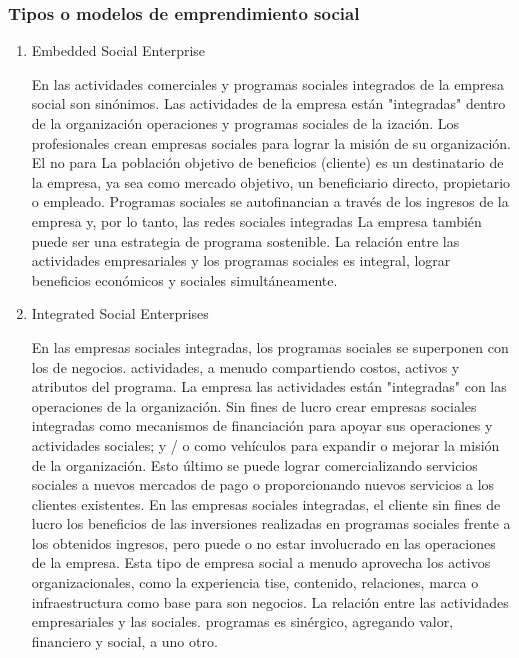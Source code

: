 \documentclass[11pt]{article}
\begin{document}
\subsubsection{Tipos o modelos de emprendimiento social}
\label{sec:orgfdc2bf1}

\begin{enumerate}
\item Embedded Social Enterprise
\label{sec:org1cf01b6}

En las actividades comerciales y programas sociales integrados de la empresa social
son sinónimos. Las actividades de la empresa están "integradas" dentro de la organización
operaciones y programas sociales de la ización. Los profesionales crean
empresas sociales para lograr la misión de su organización. El no para
La población objetivo de beneficios (cliente) es un destinatario de la empresa, ya sea como
mercado objetivo, un beneficiario directo, propietario o empleado. Programas sociales
se autofinancian a través de los ingresos de la empresa y, por lo tanto, las redes sociales integradas
La empresa también puede ser una estrategia de programa sostenible. La relación
entre las actividades empresariales y los programas sociales es integral,
lograr beneficios económicos y sociales simultáneamente.

\item Integrated Social Enterprises
\label{sec:org3e4664e}

En las empresas sociales integradas, los programas sociales se superponen con los de negocios.
actividades, a menudo compartiendo costos, activos y atributos del programa. La empresa
las actividades están "integradas" con las operaciones de la organización. Sin fines de lucro
crear empresas sociales integradas como mecanismos de financiación para apoyar sus
operaciones y actividades sociales; y / o como vehículos para expandir o mejorar
la misión de la organización. Esto último se puede lograr comercializando
servicios sociales a nuevos mercados de pago o proporcionando nuevos servicios
a los clientes existentes. En las empresas sociales integradas, el cliente sin fines de lucro
los beneficios de las inversiones realizadas en programas sociales frente a los obtenidos
ingresos, pero puede o no estar involucrado en las operaciones de la empresa. Esta
tipo de empresa social a menudo aprovecha los activos organizacionales, como la experiencia
tise, contenido, relaciones, marca o infraestructura como base para
son negocios. La relación entre las actividades empresariales y las sociales.
programas es sinérgico, agregando valor, financiero y social, a uno
otro.


\end{enumerate}
\end{document}
